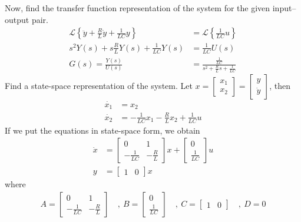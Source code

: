 \documentclass[twoside]{article}
\begin{document}
Now, find the transfer function representation of the system for the given input--output pair.
%
\begin{align*}
	\mathcal{L} \left\lbrace \ddot{y} + \frac{R}{L} \dot{y} + \frac{1}{LC} y  \right\rbrace 
	&= \mathcal{L} \left\lbrace \frac{1}{LC} u  \right\rbrace
	\\
	s^2 Y(s) + s \frac{R}{L} Y(s) + \frac{1}{LC} Y(s) &=  \frac{1}{LC} U(s) \\
	G(s) = \frac{Y(s)}{U(s)} &= \frac{\frac{1}{LC} }{s^2 + \frac{R}{L} s + \frac{1}{LC} }
\end{align*}
%
Find a state-space representation of the system.
%
Let $x = \left[ \begin{array}{c} x_1 \\ x_2 \end{array} \right] = \left[ \begin{array}{c} y \\ \dot{y} \end{array} \right]$, then 
%
\begin{align*}
	\dot{x_1} &= x_2 \\
	\dot{x_2} &= -\frac{1}{LC} x_1 - \frac{R}{L} x_2 + \frac{1}{LC} u
\end{align*}
%
If we put the equations in state-space form, we obtain
%
\begin{align*}
 \dot{x} &= \left[  \begin{array}{cc} 0 & 1 \\ -\frac{1}{LC} &  -\frac{R}{L}  \end{array} \right] x 
 +  \left[  \begin{array}{c} 0 \\ \frac{1}{LC} \end{array} \right] u
 \\
 y &= \left[  \begin{array}{cc} 1 & 0 \end{array} \right] x 
\end{align*}
%
where
%
\begin{align*}
 A = \left[  \begin{array}{cc} 0 & 1 \\ -\frac{1}{LC} &  -\frac{R}{L}  \end{array} \right] \quad , \
 B = \left[  \begin{array}{c} 0 \\ \frac{1}{LC} \end{array} \right]  \quad , \
 C = \left[  \begin{array}{cc} 1 & 0 \end{array} \right] \quad , \
 D = 0
\end{align*}
\end{document}
